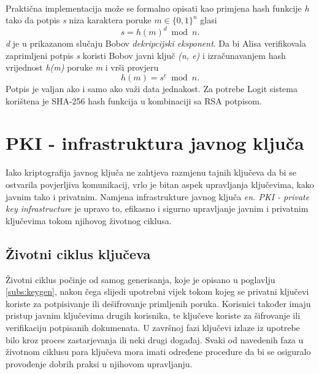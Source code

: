 \paragraph*{}
Praktična implementacija može se formalno opisati kao primjena hash funkcije \textit{h} tako da potpis \textit{s} niza karaktera poruke \(m \in \lbrace 0,1\rbrace ^n\) glasi \[s = h(m)^d\bmod n.\] \textit{d} je u prikazanom slučaju Bobov \textit{dekripcijski eksponent}. Da bi Alisa verifikovala zaprimljeni potpis \textit{s} koristi Bobov javni ključ \textit{(n, e)} i izračunavanjem hash vrijednost \textit{h(m)} poruke \textit{m} i vrši provjeru \[h(m) = s^e\bmod n.\] Potpis je valjan ako i samo ako važi data jednakost. Za potrebe Logit sistema korištena je SHA-256 hash funkcija u kombinaciji sa RSA potpisom.

\pagebreak[4]

\section{PKI - infrastruktura javnog ključa}
Iako kriptografija javnog ključa ne zahtjeva razmjenu tajnih ključeva da bi se ostvarila povjerljiva komunikacij, vrlo je bitan aspek upravljanja ključevima, kako javnim tako i privatnim. Namjena infrastrukture javnog ključa \textit{en. PKI - private key infrastructure} je upravo to, efikasno i sigurno upravljanje javnim i privatnim ključevima tokom njihovog životnog ciklusa.

\subsection{Životni ciklus ključeva}
Životni ciklus počinje od samog generisanja, koje je opisano u poglavlju \ref{subs:keygen}, nakon čega slijedi upotrebni vijek tokom kojeg se privatni ključevi koriste za potpisivanje ili dešifrovanje primljenih poruka. Korisnici također imaju pristup javnim ključevima drugih korisnika, te ključeve koriste za šifrovanje ili verifikaciju potpisanih dokumenata. U završnoj fazi ključevi izlaze iz upotrebe bilo kroz proces zastarjevanja ili neki drugi događaj. Svaki od navedenih faza u životnom ciklusu para ključeva mora imati određene procedure da bi se osiguralo provođenje dobrih praksi u njihovom upravljanju.

